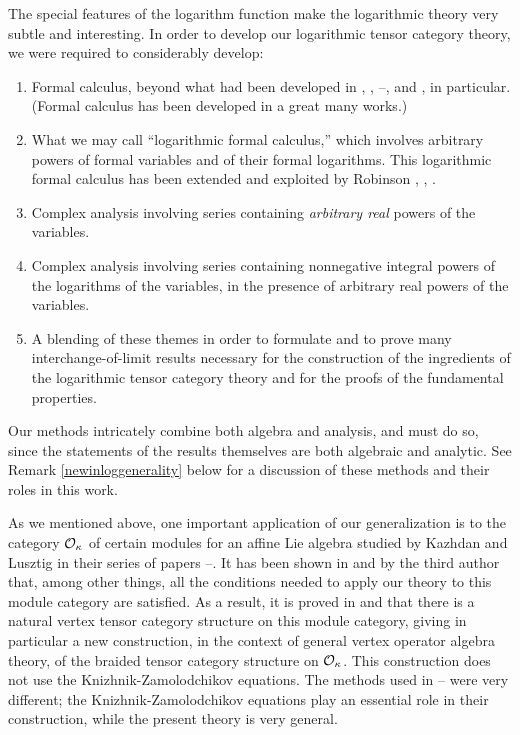 \documentclass[12pt]{article}
\begin{document}
The special features of the logarithm function make the logarithmic
theory very subtle and interesting.  In order to develop our
logarithmic tensor category theory, we were required to considerably
develop:
\begin{enumerate}
\item
Formal calculus, beyond what had been developed in \cite{FLM2},
\cite{FHL}, \cite{tensor1}--\cite{tensor3}, \cite{tensor4} and
\cite{LL}, in particular.  (Formal calculus has been developed in a
great many works.)
\item
What we may call ``logarithmic formal calculus,'' which involves
arbitrary powers of formal variables and of their formal logarithms.
This logarithmic formal calculus has been extended and exploited by
Robinson \cite{Ro1}, \cite{Ro2}, \cite{Ro3}.
\item
Complex analysis involving series containing {\it arbitrary real}
powers of the variables.
\item
Complex analysis involving series containing nonnegative integral
powers of the logarithms of the variables, in the presence of arbitrary 
real powers of the variables.
\item
A blending of these themes in order to formulate and to prove
many interchange-of-limit results necessary for the construction of
the ingredients of the logarithmic tensor category theory and for the
proofs of the fundamental properties.
\end{enumerate}
Our methods intricately combine both algebra and analysis, and must do
so, since the statements of the results themselves are both algebraic
and analytic.  See Remark \ref{newinloggenerality} below for a
discussion of these methods and their roles in this work.

As we mentioned above, one important application of our generalization
is to the category ${\cal O}_\kappa$ of certain modules for an affine
Lie algebra studied by Kazhdan and Lusztig in their series of papers
\cite{KL1}--\cite{KL5}. It has been shown in \cite{Z1} and \cite{Z2}
by the third author that, among other things, all the conditions
needed to apply our theory to this module category are satisfied.  As
a result, it is proved in \cite{Z1} and \cite{Z2} that there is a
natural vertex tensor category structure on this module category,
giving in particular a new construction, in the context of general
vertex operator algebra theory, of the braided tensor category
structure on ${\cal O}_\kappa$. This construction does not use 
the Knizhnik-Zamolodchikov equations. The methods used in
\cite{KL1}--\cite{KL5} were very different; the Knizhnik-Zamolodchikov
equations play an essential role in their construction, while the
present theory is very general.
\end{document}
